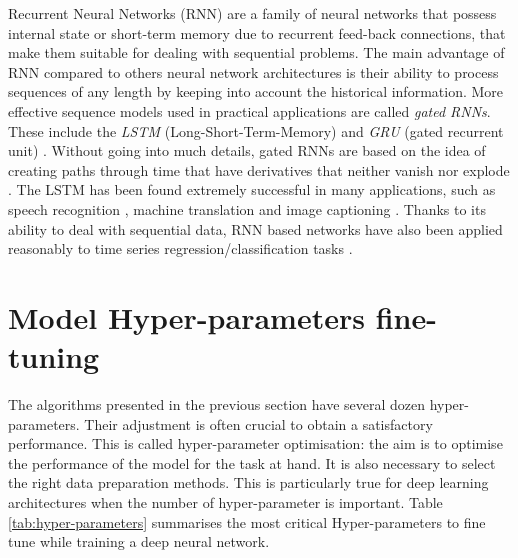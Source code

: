 Recurrent Neural Networks (RNN) \citep{rumelhart1986learning} are a family of neural networks that possess internal state or short-term memory due to recurrent feed-back connections, that make them suitable for dealing with sequential problems. The main advantage of RNN compared to others neural network architectures is their ability to process sequences of any length by keeping into account the historical information. More effective sequence models used in practical applications are called \textit{gated RNNs}. These include the \textit{LSTM} (Long-Short-Term-Memory) \citep{hochreiter1997long} and \textit{GRU} (gated recurrent unit) \citep{cho2014properties}. Without going into much details, gated RNNs are based on the idea of creating paths through time that have derivatives that neither vanish nor explode \citep{goodfellow2016deep}. The LSTM has been found extremely successful in many applications, such as speech recognition \citep{graves2013hybrid}\citep{graves2014towards}, machine translation \citep{sutskever2014sequence} and image captioning \citep{kiros2014unifying}\citep{vinyals2015show}\citep{xu2015show}. Thanks to its ability to deal with sequential data, RNN based networks have also been applied reasonably to time series regression/classification tasks \citep{smirnov2018time}.  

\section{Model Hyper-parameters fine-tuning}

The algorithms presented in the previous section have several dozen hyper-parameters. Their adjustment is often crucial to obtain a satisfactory performance. This is called hyper-parameter optimisation: the aim is to optimise the performance of the model for the task at hand. It is also necessary to select the right data preparation methods. This is particularly true for deep learning architectures when the number of hyper-parameter is important. Table \ref{tab:hyper-parameters} summarises the most critical Hyper-parameters to fine tune while training a deep neural network.

